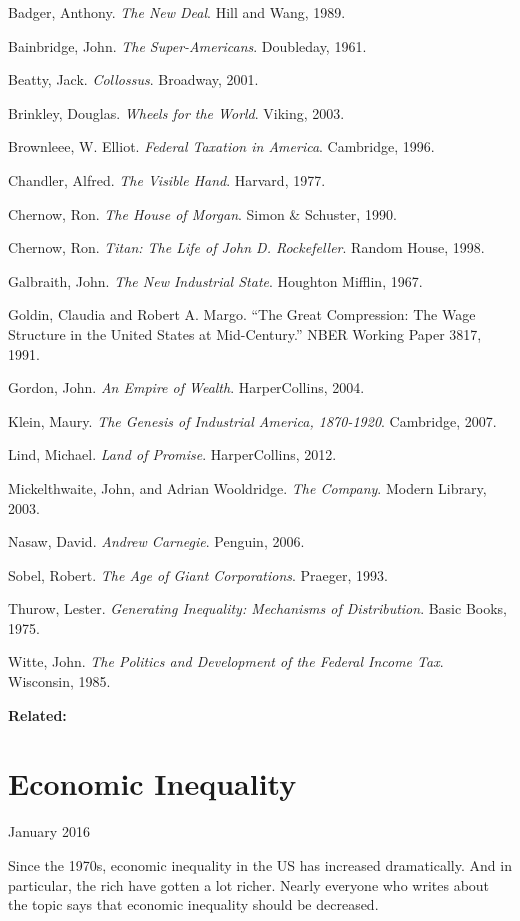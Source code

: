 \documentclass[12pt]{book}
\begin{document}
Badger, Anthony. \emph{The New Deal}. Hill and Wang, 1989.

Bainbridge, John. \emph{The Super-Americans}. Doubleday, 1961.

Beatty, Jack. \emph{Collossus}. Broadway, 2001.

Brinkley, Douglas. \emph{Wheels for the World}. Viking, 2003.

Brownleee, W. Elliot. \emph{Federal Taxation in America}. Cambridge,
1996.

Chandler, Alfred. \emph{The Visible Hand}. Harvard, 1977.

Chernow, Ron. \emph{The House of Morgan}. Simon \& Schuster, 1990.

Chernow, Ron. \emph{Titan: The Life of John D. Rockefeller}. Random
House, 1998.

Galbraith, John. \emph{The New Industrial State}. Houghton Mifflin,
1967.

Goldin, Claudia and Robert A. Margo. ``The Great Compression: The Wage
Structure in the United States at Mid-Century.'' NBER Working Paper
3817, 1991.

Gordon, John. \emph{An Empire of Wealth}. HarperCollins, 2004.

Klein, Maury. \emph{The Genesis of Industrial America, 1870-1920}.
Cambridge, 2007.

Lind, Michael. \emph{Land of Promise}. HarperCollins, 2012.

Mickelthwaite, John, and Adrian Wooldridge. \emph{The Company}. Modern
Library, 2003.

Nasaw, David. \emph{Andrew Carnegie}. Penguin, 2006.

Sobel, Robert. \emph{The Age of Giant Corporations}. Praeger, 1993.

Thurow, Lester. \emph{Generating Inequality: Mechanisms of
Distribution}. Basic Books, 1975.

Witte, John. \emph{The Politics and Development of the Federal Income
Tax}. Wisconsin, 1985.

\textbf{Related:}
\chapter{Economic Inequality}

January 2016

Since the 1970s, economic inequality in the US has increased
dramatically. And in particular, the rich have gotten a lot richer.
Nearly everyone who writes about the topic says that economic inequality
should be decreased.
\end{document}
